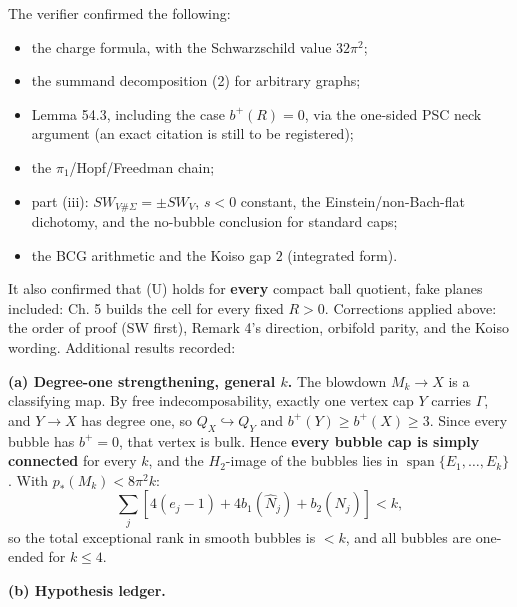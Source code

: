 \documentclass[
  10pt,
]{report}
\providecommand{\tightlist}{%
  \setlength{\itemsep}{0pt}\setlength{\parskip}{0pt}}
\begin{document}
The verifier confirmed the following:

\begin{itemize}
\tightlist
\item
  the charge formula, with the Schwarzschild value \(32\pi^2\);
\item
  the summand decomposition (2) for arbitrary graphs;
\item
  Lemma 54.3, including the case \(b^+(R)=0\), via the one-sided PSC
  neck argument (an exact citation is still to be registered);
\item
  the \(\pi_1\)/Hopf/Freedman chain;
\item
  part (iii): \(SW_{V\#\Sigma}=\pm SW_V\), \(s<0\) constant, the
  Einstein/non-Bach-flat dichotomy, and the no-bubble conclusion for
  standard caps;
\item
  the BCG arithmetic and the Koiso gap \(2\) (integrated form).
\end{itemize}

It also confirmed that (U) holds for \textbf{every} compact ball
quotient, fake planes included: Ch. 5 builds the cell for every fixed
\(R>0\). Corrections applied above: the order of proof (SW first),
Remark 4's direction, orbifold parity, and the Koiso wording. Additional
results recorded:

\textbf{(a) Degree-one strengthening, general \(k\).} The blowdown
\(M_k\to X\) is a classifying map. By free indecomposability, exactly
one vertex cap \(Y\) carries \(\Gamma\), and \(Y\to X\) has degree one,
so \(Q_X\hookrightarrow Q_Y\) and \(b^+(Y)\ge b^+(X)\ge3\). Since every
bubble has \(b^+=0\), that vertex is bulk. Hence \textbf{every bubble
cap is simply connected} for every \(k\), and the \(H_2\)-image of the
bubbles lies in \(\operatorname{span}\{E_1,\dots,E_k\}\). With
\(p_*(M_k)<8\pi^2k\): \[
\sum_j[4(e_j-1)+4b_1(\widehat N_j)+b_2(\widehat N_j)]<k ,
\] so the total exceptional rank in smooth bubbles is \(<k\), and all
bubbles are one-ended for \(k\le4\).

\textbf{(b) Hypothesis ledger.}
\end{document}
